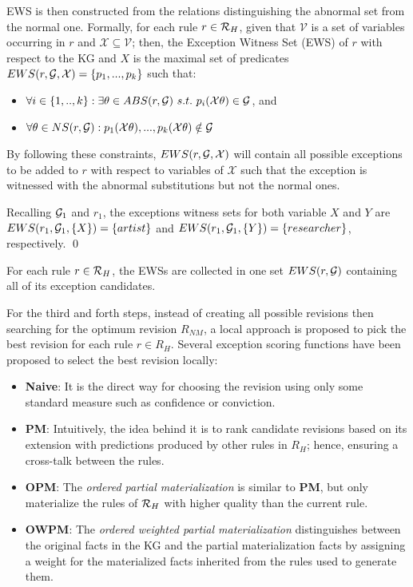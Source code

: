 EWS is then constructed from the relations distinguishing the abnormal set from the normal one. Formally, for each rule $r \in \mathcal{R}_H$, given that $\mathcal{V}$ is a set of variables occurring in $r$ and $\mathcal{X} \subseteq \mathcal{V}$; then, the Exception Witness Set (EWS) of $r$ with respect to the KG and $X$ is  the maximal set of predicates $EWS(r,\mathcal{G},\mathcal{X}) = \{p_1,...,p_k\}$ such that:
\begin{itemize}
\item $\forall i \in \{1,..,k\} : \exists \theta \in ABS(r, \mathcal{G})\ s.t.\ p_i(\mathcal{X}\theta) \in \mathcal{G}$, and 
\item $\forall \theta \in NS(r,\mathcal{G}) :  p_1(\mathcal{X}\theta), ...,p_k(\mathcal{X}\theta) \notin \mathcal{G}$
\end{itemize}

By following these constraints, $EWS(r,\mathcal{G},\mathcal{X})$ will contain all possible exceptions to be added to $r$ with respect to variables of $\mathcal{X}$ such that the exception is witnessed with the abnormal substitutions but not the normal ones.


\begin{example}
Recalling $\mathcal{G}_1$ and $r_1$, the exceptions witness sets for both variable $X$ and $Y$ are $EWS(r_1,\mathcal{G}_1,\{X\}) = \{artist\}$ and $EWS(r_1,\mathcal{G}_1,\{Y\}) = \{researcher\}$, respectively.
\qed
\end{example}
For each rule $r \in \mathcal{R}_H$, the EWSs are collected in one set $EWS(r,\mathcal{G})$ containing all of its exception candidates. 

For the third and forth steps, instead of creating all possible revisions then searching for the optimum revision $R_{NM}$, a local approach is proposed to pick the best revision for each rule $r \in R_H$. Several exception scoring functions have been proposed to select the best revision locally:
\begin{itemize}
\item \textbf{Naive}: It is the direct way for choosing the revision using only some standard measure such as confidence or conviction.
\item \textbf{PM}: Intuitively, the idea behind it is to rank candidate revisions based on its extension with predictions produced by other rules in $R_H$; hence, ensuring a cross-talk between the rules.
\item \textbf{OPM}: The \textit{ordered partial materialization} is similar to \textbf{PM}, but only materialize the rules of $\mathcal{R}_{H}$ with higher quality than the current rule.
\item \textbf{OWPM}: The \textit{ordered weighted partial materialization} distinguishes between the original facts in the KG and the partial materialization facts by assigning a weight for the materialized facts inherited  from the rules used to generate them. 
\end{itemize}

